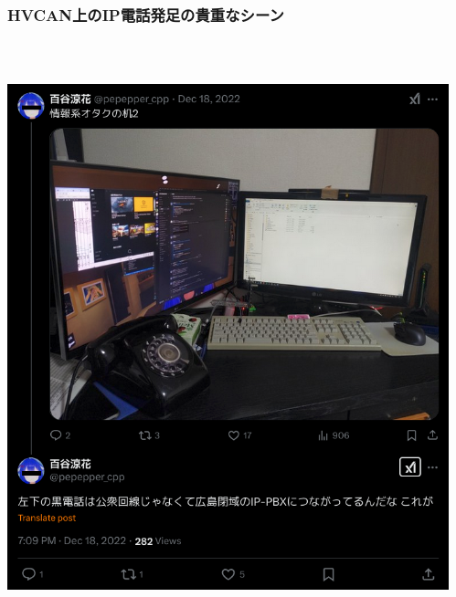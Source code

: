 \documentclass[
  lualatex,
  aspectratio=169,
  14pt
]{beamer}
\begin{document}
\begin{frame}
  \frametitle{HVCAN上のIP電話発足の貴重なシーン}

  ~\\[-.75\baselineskip]
  \begin{columns}[b]
    \begin{column}{.49\textwidth}
      \centering
      \includegraphics[height=.9\textheight]{./images/ijyou.png}
    \end{column}
    \begin{column}{.49\textwidth}
      \centering

\end{column}
\end{columns}
\end{frame}
\end{document}
